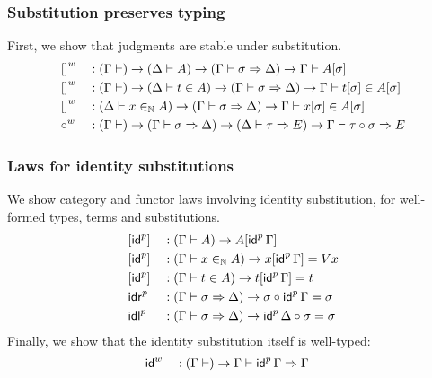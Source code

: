 \subsubsection{Substitution preserves typing}
  First, we show that judgments are stable under substitution.
\begin{alignat*}{5}
  & {[]}^w && : (\Gamma \vdash)\rightarrow(\Delta \vdash A)\rightarrow
  (\Gamma \vdash \sigma \Rightarrow \Delta) \rightarrow
  \Gamma \vdash A [ \sigma ]
  \\
  & {[]}^w && : (\Gamma \vdash)\rightarrow(\Delta \vdash t \in A)\rightarrow
  (\Gamma \vdash \sigma \Rightarrow \Delta) \rightarrow
  \Gamma \vdash t [\sigma] \in A [ \sigma ]
  \\
  & {[]}^w && : (\Delta \vdash x \in_{\mathbb{N}} A)\rightarrow
  (\Gamma \vdash \sigma \Rightarrow \Delta) \rightarrow
  \Gamma \vdash x [\sigma] \in A [ \sigma ]
  \\
  & {{\circ}}^w && :
  (\Gamma \vdash) \rightarrow
  (\Gamma \vdash \sigma \Rightarrow \Delta) \rightarrow
  (\Delta \vdash \tau \Rightarrow E) \rightarrow
  \Gamma \vdash \tau \circ \sigma \Rightarrow E
  \end{alignat*}
\subsubsection{Laws for identity substitutions}
We show category and functor laws involving identity substitution, for
well-formed types, terms and substitutions.
\begin{alignat*}{5}
  & [{\mathsf{id}}^p] && : (\Gamma \vdash A)\rightarrow A [ {\mathsf{id}}^p\,\Gamma]  \\
  & [{\mathsf{id}}^p] && : (\Gamma \vdash x \in_{\mathbb{N}} A)\rightarrow x [ {\mathsf{id}}^p\,\Gamma] = V x \\
  & [{\mathsf{id}}^p] && : (\Gamma \vdash t \in A)\rightarrow t [ {\mathsf{id}}^p\,\Gamma] = t \\
  & {\mathsf{idr}}^p && : (\Gamma \vdash \sigma \Rightarrow\Delta)\rightarrow \sigma \circ {\mathsf{id}}^p\,\Gamma = \sigma \\
  & {\mathsf{idl}}^p && : (\Gamma \vdash \sigma \Rightarrow\Delta)\rightarrow {\mathsf{id}}^p\,\Delta\circ \sigma = \sigma
  \end{alignat*}
Finally, we show that the identity substitution itself is well-typed:
  \begin{alignat*}{5}
  & {\mathsf{id}}^w && : (\Gamma \vdash)\rightarrow \Gamma \vdash {\mathsf{id}}^p\,\Gamma \Rightarrow \Gamma
  \end{alignat*}



